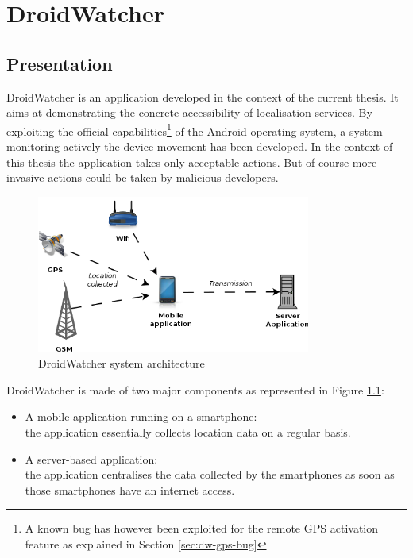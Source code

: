 
\chapter{DroidWatcher}
\label{chap:droidwatcher}

\section{Presentation}
\label{sec:dw-presentation}

DroidWatcher is an application developed in the context of the current thesis.
It aims at demonstrating the concrete accessibility of localisation services.
By exploiting the official capabilities\footnote{A known bug has however been exploited for the remote GPS activation feature as explained in Section \ref{sec:dw-gps-bug}} of the Android operating system, a system monitoring actively the device movement has been developed.
In the context of this thesis the application takes only acceptable actions.
But of course more invasive actions could be taken by malicious developers.

\begin{figure}[h]
  \centering
  \includegraphics[width=9cm]{images/dw-archi.png}
  \caption{DroidWatcher system architecture}
  \label{fig:dw-archi}
\end{figure}

DroidWatcher is made of two major components as represented in Figure \ref{fig:dw-archi}: 

\begin{itemize}
\item A mobile application running on a smartphone:\\
  the application essentially collects location data on a regular basis.
\item A server-based application:\\
  the application centralises the data collected by the smartphones as soon as those smartphones have an internet access.
\end{itemize}

